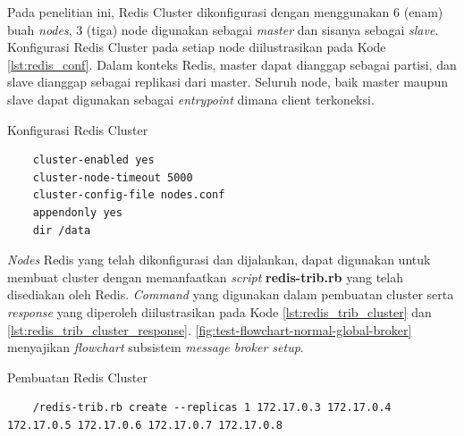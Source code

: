 Pada penelitian ini, Redis Cluster dikonfigurasi dengan menggunakan 6 (enam) buah \textit{nodes}, 3 (tiga) node digunakan sebagai \textit{master} dan sisanya sebagai \textit{slave}. Konfigurasi Redis Cluster pada setiap node diilustrasikan pada Kode \autoref{lst:redis_conf}. Dalam konteks Redis, master dapat dianggap sebagai partisi, dan slave dianggap sebagai replikasi dari master. Seluruh node, baik master maupun slave dapat digunakan sebagai \textit{entrypoint} dimana client terkoneksi.


\begin{listing}[!]
	\caption{Konfigurasi Redis Cluster}
	\label{lst:redis_conf}
	\begin{verbatim}
	cluster-enabled yes
	cluster-node-timeout 5000
	cluster-config-file nodes.conf
	appendonly yes
	dir /data
	\end{verbatim}
\end{listing}


\textit{Nodes} Redis yang telah dikonfigurasi dan dijalankan, dapat digunakan untuk membuat cluster dengan memanfaatkan  \textit{script} \textbf{redis-trib.rb} yang telah disediakan oleh Redis. \textit{Command} yang digunakan dalam pembuatan cluster serta  \textit{response} yang diperoleh diilustrasikan pada Kode \autoref{lst:redis_trib_cluster} dan \autoref{lst:redis_trib_cluster_response}. \autoref{fig:test-flowchart-normal-global-broker} 
menyajikan \textit{flowchart} subsistem \textit{message broker setup}. 


\begin{listing}[!]
	\caption{Pembuatan Redis Cluster}
	\label{lst:redis_trib_cluster}
	\begin{verbatim}
	/redis-trib.rb create --replicas 1 172.17.0.3 172.17.0.4 172.17.0.5 172.17.0.6 172.17.0.7 172.17.0.8
	\end{verbatim}
\end{listing}



